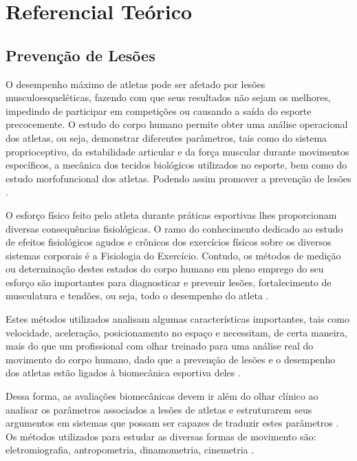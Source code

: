 
\chapter[Referencial Teórico]{Referencial Teórico}

\section{Prevenção de Lesões}

O desempenho máximo de atletas pode ser afetado por lesões musculoesqueléticas, fazendo com que seus resultados não sejam os melhores, impedindo de participar em competições ou causando a saída do esporte precocemente. O estudo do corpo humano permite obter uma análise operacional dos atletas, ou seja, demonstrar diferentes parâmetros, tais como do sistema proprioceptivo, da estabilidade articular e da força muscular durante movimentos específicos, a mecânica dos tecidos biológicos utilizados no esporte, bem como do estudo morfofuncional dos atletas. Podendo assim promover a prevenção de lesões \cite{miziara2014}.  

O esforço físico feito pelo atleta durante práticas esportivas lhes proporcionam diversas consequências fisiológicas. O ramo do conhecimento dedicado ao estudo de efeitos fisiológicos agudos e crônicos dos exercícios físicos sobre os diversos sistemas corporais é a Fisiologia do Exercício. Contudo, os métodos de medição ou determinação destes estados do corpo humano em pleno emprego do seu esforço são importantes para diagnosticar e prevenir lesões, fortalecimento de musculatura e tendões, ou seja, todo o desempenho do atleta \cite{rocha2005}.

Estes métodos utilizados analisam algumas características importantes, tais como velocidade, aceleração, posicionamento no espaço e necessitam, de certa maneira, mais do que um profissional com olhar treinado para uma análise real do movimento do corpo humano, dado que a prevenção de lesões e o desempenho dos atletas estão ligados à biomecânica esportiva deles \cite{amadio2000}.

Dessa forma, as avaliações biomecânicas devem ir além do olhar clínico ao analisar os parâmetros associados a lesões de atletas e estruturarem seus argumentos em sistemas que possam ser capazes de traduzir estes parâmetros \cite{miziara2014}. Os métodos utilizados para estudar as diversas formas de movimento são: eletromiografia, antropometria, dinamometria, cinemetria \cite{amadio2007}.

